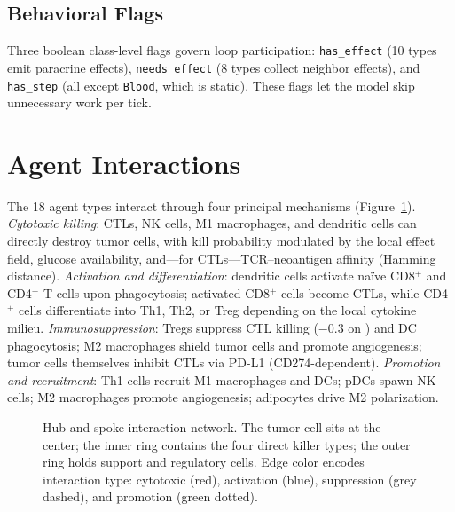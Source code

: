\FloatBarrier
\subsection{Behavioral Flags}
\label{subsec:md_flags}

Three boolean class-level flags govern loop participation: \texttt{has\_effect} (10 types emit paracrine effects), \texttt{needs\_effect} (8 types collect neighbor effects), and \texttt{has\_step} (all except \texttt{Blood}, which is static).  These flags let the model skip unnecessary work per tick.

\section{Agent Interactions}
\label{sec:md_interactions}

The 18 agent types interact through four principal mechanisms (Figure~\ref{fig:agent_interactions}). \emph{Cytotoxic killing}: CTLs, NK cells, M1 macrophages, and dendritic cells can directly destroy tumor cells, with kill probability modulated by the local effect field, glucose availability, and---for CTLs---TCR--neoantigen affinity (Hamming distance). \emph{Activation and differentiation}: dendritic cells activate na\"ive CD8$^+$ and CD4$^+$ T cells upon phagocytosis; activated CD8$^+$ cells become CTLs, while CD4$^+$ cells differentiate into Th1, Th2, or Treg depending on the local cytokine milieu. \emph{Immunosuppression}: Tregs suppress CTL killing ($-0.3$ on ) and DC phagocytosis; M2 macrophages shield tumor cells and promote angiogenesis; tumor cells themselves inhibit CTLs via PD-L1 (CD274-dependent). \emph{Promotion and recruitment}: Th1 cells recruit M1 macrophages and DCs; pDCs spawn NK cells; M2 macrophages promote angiogenesis; adipocytes drive M2 polarization.

\begin{figure}[htbp]
\centering
{}
\caption{Hub-and-spoke interaction network.  The tumor cell sits at the center; the inner ring contains the four direct killer types; the outer ring holds support and regulatory cells.  Edge color encodes interaction type: cytotoxic (red), activation (blue), suppression (grey dashed), and promotion (green dotted).}
\label{fig:agent_interactions}
\end{figure}

